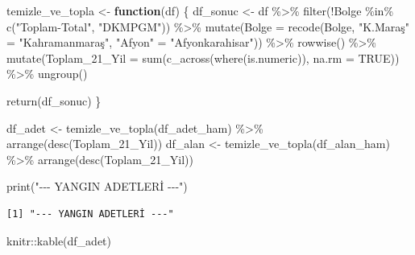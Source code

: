 \documentclass[
  11pt,
  a4paper,
  DIV=11,
  numbers=noendperiod]{scrartcl}
\newenvironment{Shaded}{\begin{snugshade}}{\end{snugshade}}
\newcommand{\AttributeTok}[1]{\textcolor[rgb]{0.40,0.45,0.13}{#1}}
\newcommand{\ConstantTok}[1]{\textcolor[rgb]{0.56,0.35,0.01}{#1}}
\newcommand{\ControlFlowTok}[1]{\textcolor[rgb]{0.00,0.23,0.31}{\textbf{#1}}}
\newcommand{\FunctionTok}[1]{\textcolor[rgb]{0.28,0.35,0.67}{#1}}
\newcommand{\NormalTok}[1]{\textcolor[rgb]{0.00,0.23,0.31}{#1}}
\newcommand{\OtherTok}[1]{\textcolor[rgb]{0.00,0.23,0.31}{#1}}
\newcommand{\SpecialCharTok}[1]{\textcolor[rgb]{0.37,0.37,0.37}{#1}}
\newcommand{\StringTok}[1]{\textcolor[rgb]{0.13,0.47,0.30}{#1}}
\begin{document}
\begin{Shaded}
\begin{Highlighting}[]
\NormalTok{temizle\_ve\_topla }\OtherTok{\textless{}{-}} \ControlFlowTok{function}\NormalTok{(df) \{}
\NormalTok{  df\_sonuc }\OtherTok{\textless{}{-}}\NormalTok{ df }\SpecialCharTok{\%\textgreater{}\%} 
    \FunctionTok{filter}\NormalTok{(}\SpecialCharTok{!}\NormalTok{Bolge }\SpecialCharTok{\%in\%} \FunctionTok{c}\NormalTok{(}\StringTok{"Toplam{-}Total"}\NormalTok{, }\StringTok{"DKMPGM"}\NormalTok{)) }\SpecialCharTok{\%\textgreater{}\%}
    \FunctionTok{mutate}\NormalTok{(}\AttributeTok{Bolge =} \FunctionTok{recode}\NormalTok{(Bolge, }\StringTok{"K.Maraş"} \OtherTok{=} \StringTok{"Kahramanmaraş"}\NormalTok{, }\StringTok{"Afyon"} \OtherTok{=} \StringTok{"Afyonkarahisar"}\NormalTok{)) }\SpecialCharTok{\%\textgreater{}\%}
    \FunctionTok{rowwise}\NormalTok{() }\SpecialCharTok{\%\textgreater{}\%}
    \FunctionTok{mutate}\NormalTok{(}\AttributeTok{Toplam\_21\_Yil =} \FunctionTok{sum}\NormalTok{(}\FunctionTok{c\_across}\NormalTok{(}\FunctionTok{where}\NormalTok{(is.numeric)), }\AttributeTok{na.rm =} \ConstantTok{TRUE}\NormalTok{)) }\SpecialCharTok{\%\textgreater{}\%}
    \FunctionTok{ungroup}\NormalTok{()}
  
  \FunctionTok{return}\NormalTok{(df\_sonuc)}
\NormalTok{\}}

\NormalTok{df\_adet }\OtherTok{\textless{}{-}} \FunctionTok{temizle\_ve\_topla}\NormalTok{(df\_adet\_ham) }\SpecialCharTok{\%\textgreater{}\%} \FunctionTok{arrange}\NormalTok{(}\FunctionTok{desc}\NormalTok{(Toplam\_21\_Yil))}
\NormalTok{df\_alan }\OtherTok{\textless{}{-}} \FunctionTok{temizle\_ve\_topla}\NormalTok{(df\_alan\_ham) }\SpecialCharTok{\%\textgreater{}\%} \FunctionTok{arrange}\NormalTok{(}\FunctionTok{desc}\NormalTok{(Toplam\_21\_Yil))}

\FunctionTok{print}\NormalTok{(}\StringTok{"{-}{-}{-} YANGIN ADETLERİ {-}{-}{-}"}\NormalTok{)}
\end{Highlighting}
\end{Shaded}

\begin{verbatim}
[1] "--- YANGIN ADETLERİ ---"
\end{verbatim}

\begin{Shaded}
\begin{Highlighting}[]
\NormalTok{knitr}\SpecialCharTok{::}\FunctionTok{kable}\NormalTok{(df\_adet)}
\end{Highlighting}
\end{Shaded}
\end{document}
